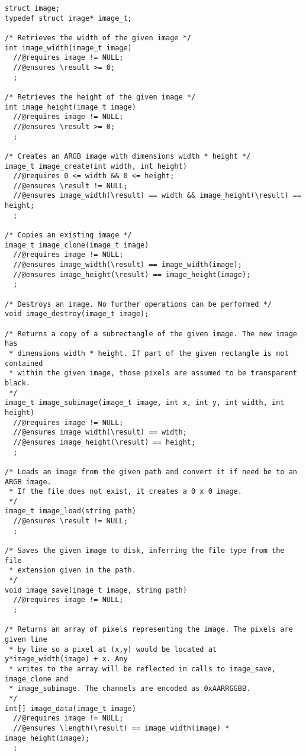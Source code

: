 \documentclass[11pt]{article}
\renewcommand{\_}{\char`\_}
\renewcommand{\{}{\char`\{}
\renewcommand{\}}{\char`\}}
\begin{document}
\begin{small}
\begin{verbatim}
struct image;
typedef struct image* image_t;

/* Retrieves the width of the given image */
int image_width(image_t image)
  //@requires image != NULL;
  //@ensures \result >= 0;
  ;

/* Retrieves the height of the given image */
int image_height(image_t image)
  //@requires image != NULL;
  //@ensures \result >= 0;
  ;

/* Creates an ARGB image with dimensions width * height */
image_t image_create(int width, int height)
  //@requires 0 <= width && 0 <= height;
  //@ensures \result != NULL;
  //@ensures image_width(\result) == width && image_height(\result) == height;
  ;

/* Copies an existing image */
image_t image_clone(image_t image)
  //@requires image != NULL;
  //@ensures image_width(\result) == image_width(image);
  //@ensures image_height(\result) == image_height(image);
  ;

/* Destroys an image. No further operations can be performed */
void image_destroy(image_t image);

/* Returns a copy of a subrectangle of the given image. The new image has
 * dimensions width * height. If part of the given rectangle is not contained
 * within the given image, those pixels are assumed to be transparent black.
 */
image_t image_subimage(image_t image, int x, int y, int width, int height)
  //@requires image != NULL;
  //@ensures image_width(\result) == width;
  //@ensures image_height(\result) == height;
  ;

/* Loads an image from the given path and convert it if need be to an ARGB image.
 * If the file does not exist, it creates a 0 x 0 image.
 */
image_t image_load(string path)
  //@ensures \result != NULL;
  ;

/* Saves the given image to disk, inferring the file type from the file
 * extension given in the path.
 */
void image_save(image_t image, string path)
  //@requires image != NULL;
  ;

/* Returns an array of pixels representing the image. The pixels are given line
 * by line so a pixel at (x,y) would be located at y*image_width(image) + x. Any
 * writes to the array will be reflected in calls to image_save, image_clone and
 * image_subimage. The channels are encoded as 0xAARRGGBB.
 */
int[] image_data(image_t image)
  //@requires image != NULL;
  //@ensures \length(\result) == image_width(image) * image_height(image);
  ;
\end{verbatim}
\end{small}
\end{document}

